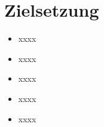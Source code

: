 \section{Zielsetzung}

\begin{itemize}

   \item xxxx
   \item xxxx
   \item xxxx
   \item xxxx
   \item xxxx
\end{itemize}








